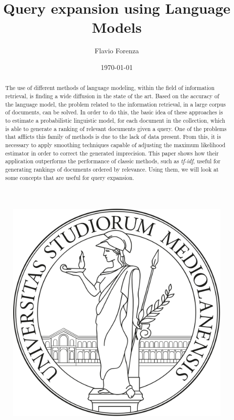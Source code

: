 \documentclass[letterpaper,12pt]{article}
\begin{document}
    
\title{\bfseries{Query expansion using Language Models}}
\author{Flavio Forenza}
\date\today
\maketitle

\begin{figure}[h!]
  \centering
  \includegraphics[width=0.2\linewidth]{images/logoUnimi2.png}
  \centering
\end{figure}

\begin{abstract}
  The use of different methods of language modeling, within the field 
  of information retrieval, is finding a wide diffusion in the state of the 
  art. Based on the accuracy of the language model, the problem related 
  to the information retrieval, in a large corpus of documents, can be 
  solved. In order to do this, the basic idea of these approaches is to 
  estimate a probabilistic linguistic model, for each document in the 
  collection, which is able to generate a ranking of relevant documents 
  given a query. One of the problems that afflicts this family of methods 
  is due to the lack of data present. From this, it is necessary to apply 
  smoothing techniques capable of adjusting the maximum likelihood 
  estimator in order to correct the generated imprecision. This paper 
  shows how their application outperforms the performance of classic 
  methods, such as \emph{tf-idf}, useful for generating rankings of 
  documents ordered by relevance. Using them, we will look at some concepts that 
  are useful for query expansion.
\end{abstract}



\newpage


\newpage


\end{document}
